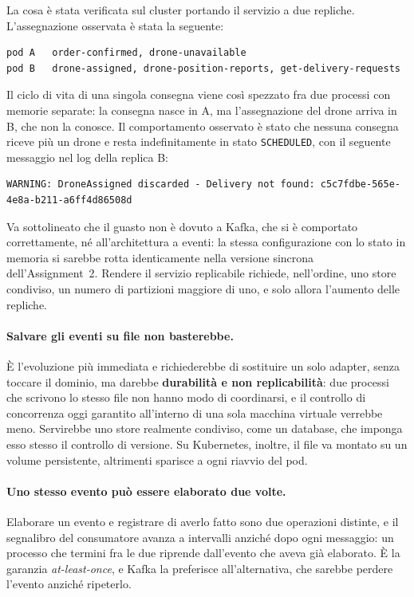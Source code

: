 \documentclass[12pt,a4paper]{article}
\begin{document}
La cosa \`e stata verificata sul cluster portando il servizio a due repliche. L'assegnazione
osservata \`e stata la seguente:

\begin{lstlisting}[caption={Assegnazione dei canali con due repliche del delivery-service}]
pod A   order-confirmed, drone-unavailable
pod B   drone-assigned, drone-position-reports, get-delivery-requests
\end{lstlisting}

Il ciclo di vita di una singola consegna viene cos\`i spezzato fra due processi con memorie
separate: la consegna nasce in A, ma l'assegnazione del drone arriva in B, che non la conosce. Il
comportamento osservato \`e stato che nessuna consegna riceve pi\`u un drone e resta
indefinitamente in stato \texttt{SCHEDULED}, con il seguente messaggio nel log della replica B:

\begin{lstlisting}[caption={Esito osservato}]
WARNING: DroneAssigned discarded - Delivery not found: c5c7fdbe-565e-4e8a-b211-a6ff4d86508d
\end{lstlisting}

Va sottolineato che il guasto non \`e dovuto a Kafka, che si \`e comportato correttamente, n\'e
all'architettura a eventi: la stessa configurazione con lo stato in memoria si sarebbe rotta
identicamente nella versione sincrona dell'Assignment~2. Rendere il servizio replicabile richiede,
nell'ordine, uno store condiviso, un numero di partizioni maggiore di uno, e solo allora l'aumento
delle repliche.

\paragraph{Salvare gli eventi su file non basterebbe.} \`E l'evoluzione pi\`u immediata e
richiederebbe di sostituire un solo adapter, senza toccare il dominio, ma darebbe
\textbf{durabilit\`a e non replicabilit\`a}: due processi che scrivono lo stesso file non hanno modo
di coordinarsi, e il controllo di concorrenza oggi garantito all'interno di una sola macchina
virtuale verrebbe meno. Servirebbe uno store realmente condiviso, come un database, che imponga
esso stesso il controllo di versione. Su Kubernetes, inoltre, il file va montato su un volume
persistente, altrimenti sparisce a ogni riavvio del pod.

\paragraph{Uno stesso evento pu\`o essere elaborato due volte.} Elaborare un evento e registrare di
averlo fatto sono due operazioni distinte, e il segnalibro del consumatore avanza a intervalli
anzich\'e dopo ogni messaggio: un processo che termini fra le due riprende dall'evento che aveva
gi\`a elaborato. \`E la garanzia \emph{at-least-once}, e Kafka la preferisce all'alternativa, che
sarebbe perdere l'evento anzich\'e ripeterlo.
\end{document}
